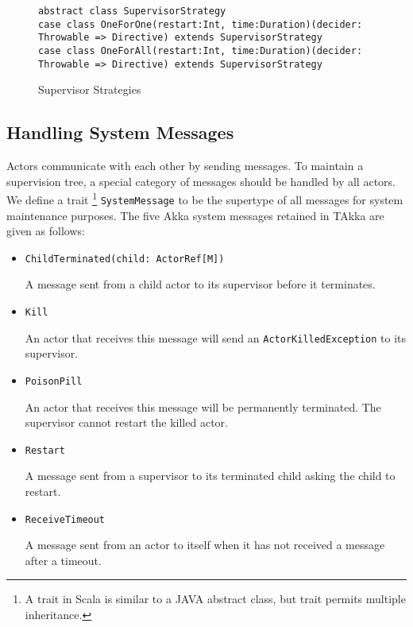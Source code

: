 \begin{figure}[h]
\label{super}
    \begin{lstlisting}    
abstract class SupervisorStrategy
case class OneForOne(restart:Int, time:Duration)(decider: Throwable => Directive) extends SupervisorStrategy
case class OneForAll(restart:Int, time:Duration)(decider: Throwable => Directive) extends SupervisorStrategy
    \end{lstlisting}
    \caption{Supervisor Strategies}
\end{figure}


\subsection{Handling System Messages}
\label{systemmessage}
Actors communicate with each other by sending messages.  To maintain a
supervision tree,
a special category of messages should be handled by all actors.  We define
a trait \footnote{A trait in Scala is similar to a JAVA abstract class, but
trait permits multiple inheritance.} {\tt SystemMessage} to be the
supertype of all messages for system maintenance purposes.  The five Akka
system messages retained in TAkka are given as follows:

\begin{itemize}
  \item {\tt ChildTerminated(child: ActorRef[M])}

  A message sent from a child actor to its supervisor before it terminates.

  \item {\tt Kill}

  An actor that receives this message will send an {\tt ActorKilledException} 
to its supervisor.

  \item {\tt PoisonPill}

  An actor that receives this message will be permanently terminated.  The
supervisor cannot restart the killed actor.
  
  \item {\tt Restart}

  A message sent from a supervisor to its terminated child asking the
child to restart.

  \item {\tt ReceiveTimeout}

  A message sent from an actor to itself when it has not received a message
after a timeout.

\end{itemize}


